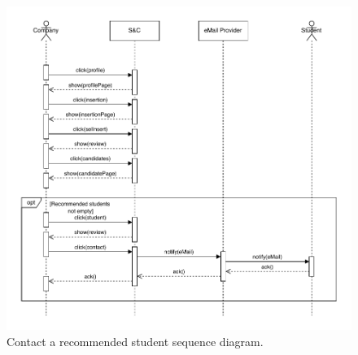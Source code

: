 \begin{figure}[H]
    \begin{center}
        \includegraphics[width=\linewidth]{Images/SequenceDiagram/ContactStudentSD.pdf}
        \caption{Contact a recommended student sequence diagram.}
        \label{fig:contact_student_seqdiag}%
    \end{center}
\end{figure}


